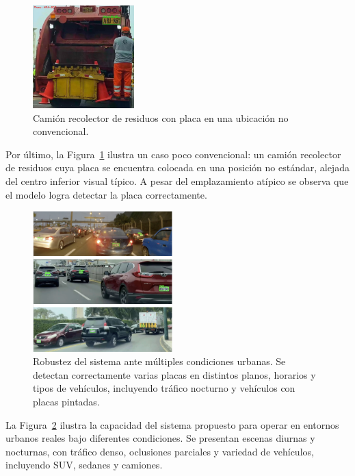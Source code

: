 \documentclass[conference]{IEEEtran}
\begin{document}
\begin{figure}[h]
\centering
\includegraphics[width=0.35\textwidth]{figs/non_standard_plate.jpeg}
\caption{Camión recolector de residuos con placa en una ubicación no convencional.}
\label{fig:non_standard_plate}
\end{figure}

Por último, la Figura~\ref{fig:non_standard_plate} ilustra un caso poco convencional: un camión recolector de residuos cuya placa se encuentra colocada en una posición no estándar, alejada del centro inferior visual típico. A pesar del emplazamiento atípico se observa que el modelo logra detectar la placa correctamente.

\begin{figure}[ht]
\centering
\includegraphics[width=0.48\textwidth]{figs/multi_vehicle_collage.png}
\caption{Robustez del sistema ante múltiples condiciones urbanas. Se detectan correctamente varias placas en distintos planos, horarios y tipos de vehículos, incluyendo tráfico nocturno y vehículos con placas pintadas.}
\label{fig:multi_vehicle_collage}
\end{figure}

La Figura~\ref{fig:multi_vehicle_collage} ilustra la capacidad del sistema propuesto para operar en entornos urbanos reales bajo diferentes condiciones. Se presentan escenas diurnas y nocturnas, con tráfico denso, oclusiones parciales y variedad de vehículos, incluyendo SUV, sedanes y camiones.
\end{document}
